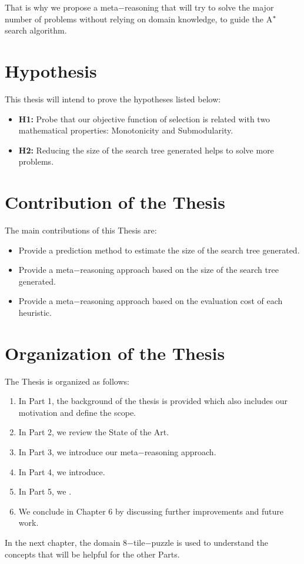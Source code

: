 That is why we propose a meta$-$reasoning that will try to solve the major number of problems without relying on domain knowledge, to guide the A$\sp{*}$ search algorithm.

\section{Hypothesis}
\noindent
This thesis will intend to prove the hypotheses listed below:
\begin{itemize}
\item \textbf{H1:} Probe that our objective function of selection is related with two mathematical properties: Monotonicity and Submodularity.
\item \textbf{H2:} Reducing the size of the search tree generated helps to solve more problems.
\end{itemize}

\section{Contribution of the Thesis}
\noindent
The main contributions of this Thesis are:
\begin{itemize}
\item Provide a prediction method to estimate the size of the search tree generated.
\item Provide a meta$-$reasoning approach based on the size of the search tree generated.
\item Provide a meta$-$reasoning approach based on the evaluation cost of each heuristic. 
\end{itemize}

\section{Organization of the Thesis}
\noindent
The Thesis is organized as follows: 
\begin{enumerate}
\item In Part 1, the background of the thesis is provided which also includes our motivation and define the scope. 
\item In Part 2, we review the State of the Art.
\item In Part 3, we introduce our meta$-$reasoning approach. 
\item In Part 4, we introduce. 
\item In Part 5, we .
\item We conclude in Chapter 6 by discussing further improvements and future work.
\end{enumerate}

In the next chapter, the domain 8$-$tile$-$puzzle is used to understand the concepts that will be helpful for the other Parts. \\

\clearpage